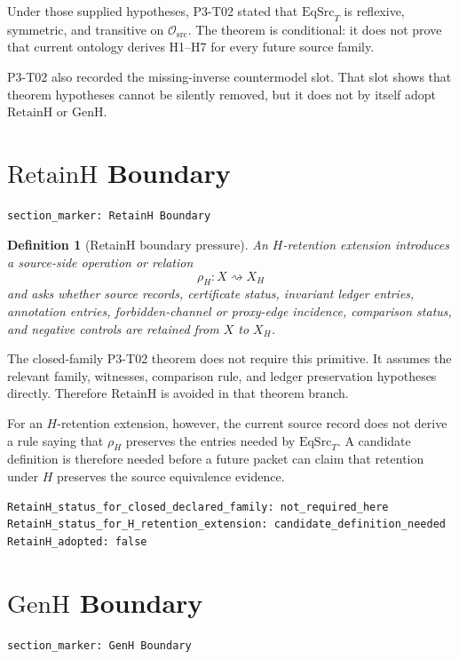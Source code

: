 \documentclass[11pt]{article}
\newcommand{\EqSrcT}{\mathrm{EqSrc}_{T}}
\newcommand{\RetainH}{\mathrm{RetainH}}
\newcommand{\GenH}{\mathrm{GenH}}
\newcommand{\Osrc}{\mathcal{O}_{\mathrm{src}}}
\newcommand{\Hret}{\rho_{H}}
\newtheorem{definition}{Definition}
\begin{document}
Under those supplied hypotheses, P3-T02 stated that \(\EqSrcT\) is reflexive,
symmetric, and transitive on \(\Osrc\). The theorem is conditional: it does not
prove that current ontology derives H1--H7 for every future source family.

P3-T02 also recorded the missing-inverse countermodel slot. That slot shows
that theorem hypotheses cannot be silently removed, but it does not by itself
adopt \(\RetainH\) or \(\GenH\).

\section{\(\RetainH\) Boundary}

\begin{verbatim}
section_marker: RetainH Boundary
\end{verbatim}

\begin{definition}[RetainH boundary pressure]
An \(H\)-retention extension introduces a source-side operation or relation
\[
  \Hret:X\rightsquigarrow X_{H}
\]
and asks whether source records, certificate status, invariant ledger entries,
annotation entries, forbidden-channel or proxy-edge incidence, comparison
status, and negative controls are retained from \(X\) to \(X_{H}\).
\end{definition}

The closed-family P3-T02 theorem does not require this primitive. It assumes
the relevant family, witnesses, comparison rule, and ledger preservation
hypotheses directly. Therefore \(\RetainH\) is avoided in that theorem branch.

For an \(H\)-retention extension, however, the current source record does not
derive a rule saying that \(\Hret\) preserves the entries needed by
\(\EqSrcT\). A candidate definition is therefore needed before a future packet
can claim that retention under \(H\) preserves the source equivalence evidence.

\begin{verbatim}
RetainH_status_for_closed_declared_family: not_required_here
RetainH_status_for_H_retention_extension: candidate_definition_needed
RetainH_adopted: false
\end{verbatim}

\section{\(\GenH\) Boundary}

\begin{verbatim}
section_marker: GenH Boundary
\end{verbatim}
\end{document}
